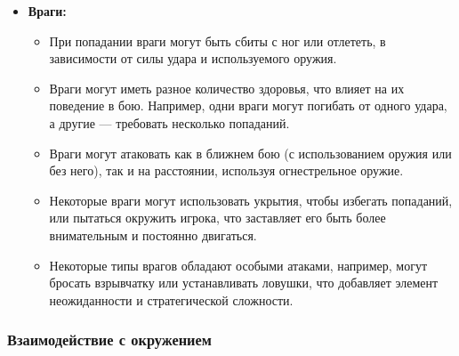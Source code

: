 \documentclass[12pt]{article}
\begin{document}
\begin{itemize}
\begin{itemize}
\begin{itemize}
                \end{itemize}
            \end{itemize}
            \item \textbf{Враги:} 
                \begin{itemize}
                    \item При попадании враги могут быть сбиты с ног или отлететь, в зависимости от силы удара и используемого оружия.
                    \item Враги могут иметь разное количество здоровья, что влияет на их поведение в бою. Например, одни враги могут погибать от одного удара, а другие — требовать несколько попаданий.
                    \item Враги могут атаковать как в ближнем бою (с использованием оружия или без него), так и на расстоянии, используя огнестрельное оружие.
                    \item Некоторые враги могут использовать укрытия, чтобы избегать попаданий, или пытаться окружить игрока, что заставляет его быть более внимательным и постоянно двигаться.
                    \item Некоторые типы врагов обладают особыми атаками, например, могут бросать взрывчатку или устанавливать ловушки, что добавляет элемент неожиданности и стратегической сложности.
                \end{itemize}
        \end{itemize}
        
        \subsubsection{Взаимодействие с окружением}
\end{document}
